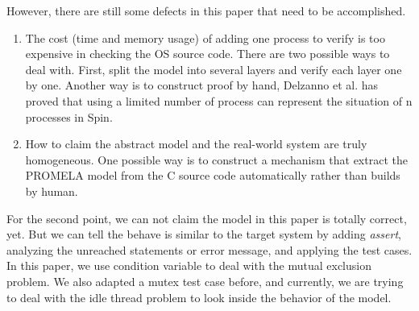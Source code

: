 However, there are still some defects in this paper that need to be accomplished.

\begin{enumerate}
\item The cost (time and memory usage) of adding one process to verify is too expensive in checking the OS source code. There are two possible ways to deal with. First, split the model into several layers and verify each layer one by one. Another way is to construct proof by hand, Delzanno et al. \cite{EPTCS161.13} has proved that using a limited number of process can represent the situation of n processes in Spin.
\item How to claim the abstract model and the real-world system are truly homogeneous. One possible way is to construct a mechanism that extract the PROMELA model from the C source code automatically rather than builds by human.
\end{enumerate}

For the second point, we can not claim the model in this paper is totally correct, yet. But we can tell the behave is similar to the target system by adding \textit{assert}, analyzing the unreached statements or error message, and applying the test cases. In this paper, we use condition variable to deal with the mutual exclusion problem. We also adapted a mutex test case before, and currently, we are trying to deal with the idle thread problem to look inside the behavior of the model.
